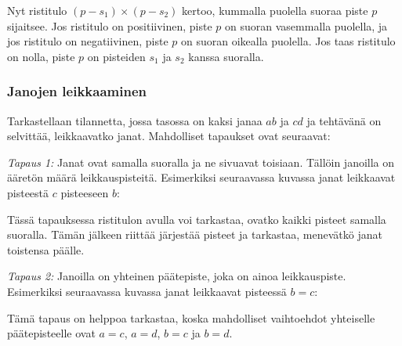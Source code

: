 Nyt ristitulo $(p-s_1) \times (p-s_2)$
kertoo, kummalla puolella suoraa piste $p$ sijaitsee.
Jos ristitulo on positiivinen,
piste $p$ on suoran vasemmalla puolella,
ja jos ristitulo on negatiivinen,
piste $p$ on suoran oikealla puolella.
Jos taas ristitulo on nolla,
piste $p$ on pisteiden $s_1$ ja $s_2$
kanssa suoralla.

\subsubsection{Janojen leikkaaminen}

Tarkastellaan tilannetta, jossa tasossa on kaksi
janaa $ab$ ja $cd$ ja tehtävänä on selvittää,
leikkaavatko janat. Mahdolliset tapaukset ovat seuraavat:

\textit{Tapaus 1:}
Janat ovat samalla suoralla ja ne sivuavat toisiaan.
Tällöin janoilla on ääretön määrä leikkauspisteitä.
Esimerkiksi seuraavassa kuvassa janat leikkaavat
pisteestä $c$ pisteeseen $b$:
\begin{center}
\end{center}

Tässä tapauksessa ristitulon avulla voi tarkastaa,
ovatko kaikki pisteet samalla suoralla.
Tämän jälkeen riittää järjestää pisteet ja
tarkastaa, menevätkö janat toistensa päälle.

\textit{Tapaus 2:}
Janoilla on yhteinen päätepiste, joka on
ainoa leikkauspiste.
Esimerkiksi seuraavassa kuvassa
janat leikkaavat pisteessä $b=c$:

\begin{center}
\end{center}

Tämä tapaus on helppoa tarkastaa,
koska mahdolliset vaihtoehdot
yhteiselle päätepisteelle ovat
$a=c$, $a=d$, $b=c$ ja $b=d$.

